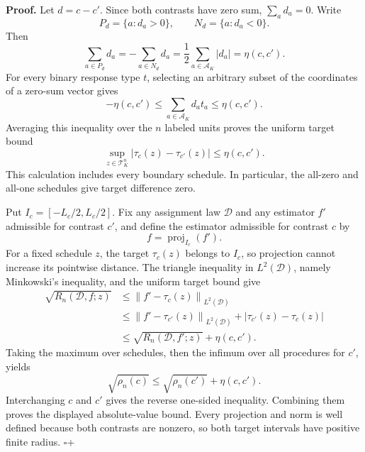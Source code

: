 \textbf{Proof.}
Let \(d=c-c'\).  Since both contrasts have zero sum, \(\sum_a d_a=0\).  Write
\[
 P_d=\{a:d_a>0\},\qquad N_d=\{a:d_a<0\}.
\]
Then
\[
 \sum_{a\in P_d}d_a=-\sum_{a\in N_d}d_a
 =\frac12\sum_{a\in\mathcal A_K}|d_a|=\eta(c,c').
\]
For every binary response type \(t\), selecting an arbitrary subset of the coordinates of a zero-sum vector gives
\[
 -\eta(c,c')\leq\sum_{a\in\mathcal A_K}d_at_a\leq\eta(c,c').
\]
Averaging this inequality over the \(n\) labeled units proves the uniform target bound
\[
 \sup_{z\in\mathcal T_K^n}|\tau_c(z)-\tau_{c'}(z)|
 \leq\eta(c,c').
\]
This calculation includes every boundary schedule.  In particular, the all-zero and all-one schedules give target difference zero.

Put \(I_c=[-L_c/2,L_c/2]\).  Fix any assignment law \(\mathcal D\) and any estimator \(f'\) admissible for contrast \(c'\), and define the estimator admissible for contrast \(c\) by
\[
 f=\operatorname{proj}_{I_c}(f').
\]
For a fixed schedule \(z\), the target \(\tau_c(z)\) belongs to \(I_c\), so projection cannot increase its pointwise distance.  The triangle inequality in \(L^2(\mathcal D)\), namely Minkowski's inequality, and the uniform target bound give
\[
 \begin{aligned}
 \sqrt{R_n(\mathcal D,f;z)}
 &\leq
 \left\|f'-\tau_c(z)\right\|_{L^2(\mathcal D)}\\
 &\leq
 \left\|f'-\tau_{c'}(z)\right\|_{L^2(\mathcal D)}
 +|\tau_{c'}(z)-\tau_c(z)|\\
 &\leq \sqrt{R_n(\mathcal D,f';z)}+\eta(c,c').
 \end{aligned}
\]
Taking the maximum over schedules, then the infimum over all procedures for \(c'\), yields
\[
 \sqrt{\rho_n(c)}\leq\sqrt{\rho_n(c')}+\eta(c,c').
\]
Interchanging \(c\) and \(c'\) gives the reverse one-sided inequality.  Combining them proves the displayed absolute-value bound.  Every projection and norm is well defined because both contrasts are nonzero, so both target intervals have positive finite radius. \(\square\)+